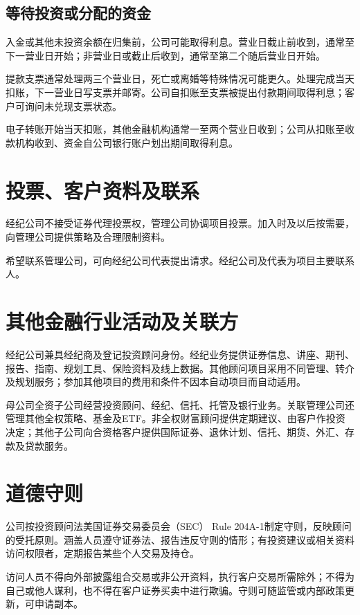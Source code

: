 \documentclass[UTF8,fontset=none,11pt,a4paper]{ctexart}
\begin{document}
\subsection*{等待投资或分配的资金}
入金或其他未投资余额在归集前，公司可能取得利息。营业日截止前收到，通常至下一营业日开始；非营业日或截止后收到，通常至第二个随后营\allowbreak\mbox{业日开始。}


提款支票通常处理两三个营业日，死亡或离婚等特殊情况可能更久。处理完成当天扣账，下一营业日写支票并邮寄。公司自扣账至支票被提出付款期间取得利息；客户可询问未兑现\allowbreak\mbox{支票状态。}


电子转账开始当天扣账，其他金融机构通常一至两个营业日收到；公司从扣账至收款机构收到、资金自公司银行账户划出期间\allowbreak\mbox{取得利息。}


\section*{投票、客户资料及联系}
经纪公司不接受证券代理投票权，管理公司协调项目投票。加入时及以后按需要，向管理公司提供策略及合理\allowbreak\mbox{限制资料。}


希望联系管理公司，可向经纪公司代表提出请求。经纪公司及代表为项目主\allowbreak\mbox{要联系人。}


\section*{其他金融行业活动及关联方}
经纪公司兼具经纪商及登记投资顾问身份。经纪业务提供证券信息、讲座、期刊、报告、指南、规划工具、保险资料及线上数据。其他顾问项目采用不同管理、转介及规划服务；参加其他项目的费用和条件不因本自动项目而\allowbreak\mbox{自动适用。}


母公司全资子公司经营投资顾问、经纪、信托、托管及银行业务。关联管理公司还管理其他全权策略、基金及ETF。非全权财富顾问提供定期建议、由客户作投资决定；其他子公司向合资格客户提供国际证券、退休计划、信托、期货、外汇、存款及\allowbreak\mbox{贷款服务。}


\section*{道德守则}
公司按投资顾问法美国证券交易委员会（SEC） Rule 204A-1制定守则，反映顾问的受托原则。涵盖人员遵守证券法、报告违反守则的情形；有投资建议或相关资料访问权限者，定期报告某些个人交易\allowbreak\mbox{及持仓。}


访问人员不得向外部披露组合交易或非公开资料，执行客户交易所需除外；不得为自己或他人谋利，也不得在客户证券买卖中进行欺骗。守则可随监管或内部政策更新，可\allowbreak\mbox{申请副本。}
\end{document}
